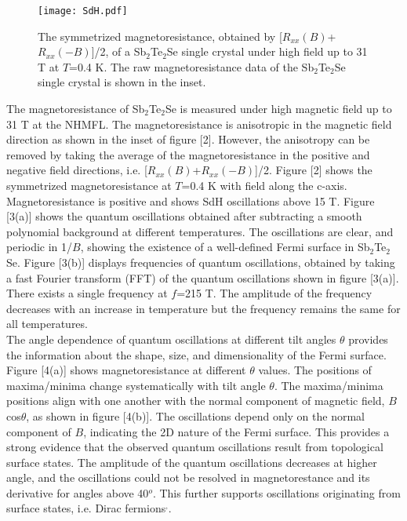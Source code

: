 \documentclass[aps,prb,twocolumn,showpacs,groupedaddress]{revtex4-1}
\begin{document}
\begin{figure}
  \centering
  \texttt{[image: SdH.pdf]}
  \caption{The symmetrized magnetoresistance, obtained by [$R_{xx}(B)$+$R_{xx}(-B)$]/2, of a Sb$_2$Te$_2$Se single crystal under high field up to 31 T at $T$=0.4 K. The raw magnetoresistance data of the Sb$_2$Te$_2$Se single crystal is shown in the inset.}\label{SdH}
\end{figure}
 The magnetoresistance of Sb$_2$Te$_2$Se is measured under high magnetic field up to 31 T at the NHMFL. The magnetoresistance is  anisotropic in the magnetic field direction as shown in the inset of figure [2]. However, the anisotropy can be removed by  taking the average of the magnetoresistance in the positive and negative field directions, i.e. [$R_{xx}(B)$+$R_{xx}(-B)$]/2. Figure [2] shows the symmetrized magnetoresistance at $T$=0.4 K with field along the c-axis. Magnetoresistance is positive and shows SdH oscillations above 15 T. Figure [3(a)] shows the quantum oscillations obtained after subtracting a smooth polynomial background at different temperatures. The oscillations are clear, and periodic in 1/$B$, showing the existence of a well-defined Fermi surface in Sb$_2$Te$_2$Se. Figure [3(b)] displays frequencies of quantum oscillations, obtained by taking a fast Fourier transform (FFT) of the quantum oscillations shown in figure [3(a)]. There exists a single frequency at $f$=215 T. The amplitude of the frequency decreases with an increase in temperature but the frequency remains the same for all temperatures.\\
\indent The angle dependence of quantum oscillations at different tilt angles $\theta$ provides the information about the shape, size, and dimensionality of the Fermi surface. Figure [4(a)] shows magnetoresistance at different $\theta$ values. The positions of maxima/minima change systematically with tilt angle $\theta$. The maxima/minima positions align with one another with the normal component of magnetic field, $B$cos$\theta$, as shown in figure [4(b)]. The oscillations depend only on the normal component of $B$, indicating the 2D nature of the Fermi surface. This provides a strong evidence that the observed quantum oscillations result from topological surface states\cite{Ren:21}. The amplitude of the quantum oscillations decreases at higher angle, and the oscillations could not be resolved in magnetorestance and its derivative for angles above 40$^{o}$. This further supports oscillations originating from surface states, i.e. Dirac fermions\cite{Ando:03}$^,$\cite{Qu:11}.
\end{document}
